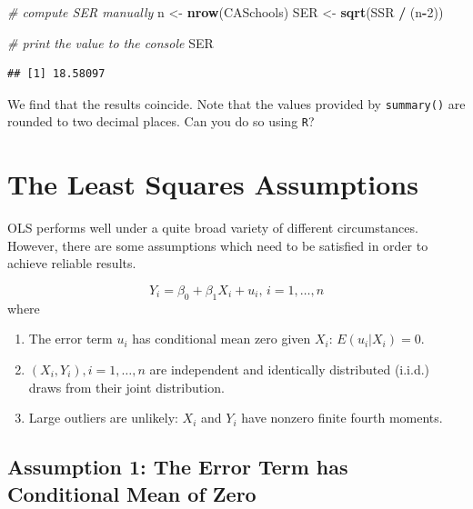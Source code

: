 \documentclass[]{book}
\newenvironment{Shaded}{\begin{snugshade}}{\end{snugshade}}
\newcommand{\KeywordTok}[1]{\textcolor[rgb]{0.13,0.29,0.53}{\textbf{#1}}}
\newcommand{\DecValTok}[1]{\textcolor[rgb]{0.00,0.00,0.81}{#1}}
\newcommand{\StringTok}[1]{\textcolor[rgb]{0.31,0.60,0.02}{#1}}
\newcommand{\CommentTok}[1]{\textcolor[rgb]{0.56,0.35,0.01}{\textit{#1}}}
\newcommand{\OperatorTok}[1]{\textcolor[rgb]{0.81,0.36,0.00}{\textbf{#1}}}
\newcommand{\NormalTok}[1]{#1}
\theoremstyle{definition}
\theoremstyle{definition}
\theoremstyle{definition}
\theoremstyle{remark}
\begin{document}
\begin{Shaded}
\begin{Highlighting}[]
\CommentTok{# compute SER manually}
\NormalTok{n <-}\StringTok{ }\KeywordTok{nrow}\NormalTok{(CASchools)}
\NormalTok{SER <-}\StringTok{ }\KeywordTok{sqrt}\NormalTok{(SSR }\OperatorTok{/}\StringTok{ }\NormalTok{(n}\OperatorTok{-}\DecValTok{2}\NormalTok{))}

\CommentTok{# print the value to the console}
\NormalTok{SER}
\end{Highlighting}
\end{Shaded}

\begin{verbatim}
## [1] 18.58097
\end{verbatim}

We find that the results coincide. Note that the values provided by
\texttt{summary()} are rounded to two decimal places. Can you do so
using \texttt{R}?

\section{The Least Squares Assumptions}\label{tlsa}

OLS performs well under a quite broad variety of different
circumstances. However, there are some assumptions which need to be
satisfied in order to achieve reliable results.

\begin{keyconcepts}{4.3}
$$Y_i = \beta_0 + \beta_1 X_i + u_i \text{, } i = 1,\dots,n$$
where

\begin{enumerate}
\item The error term $u_i$ has conditional mean zero given $X_i$: $E(u_i|X_i) = 0$.
\item $(X_i,Y_i), i = 1,\dots,n$ are independent and identically distributed (i.i.d.) draws from their joint distribution.
\item Large outliers are unlikely: $X_i$ and $Y_i$ have nonzero finite fourth moments.
\end{enumerate}
\end{keyconcepts}

\subsection*{Assumption 1: The Error Term has Conditional Mean of
Zero}\label{assumption-1-the-error-term-has-conditional-mean-of-zero}
\end{document}
